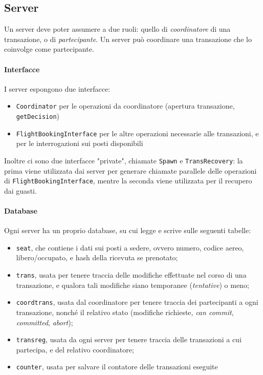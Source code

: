 \documentclass[a4paper]{article}
\begin{document}
\subsection{Server}
Un server deve poter assumere a due ruoli: quello di \textit{coordinatore} di una transazione, o di \textit{partecipante}. Un server può coordinare una transazione che lo coinvolge come partecipante.

\paragraph{Interfacce}I server espongono due interfacce:
\begin{itemize}
	\item \texttt{Coordinator} per le operazioni da coordinatore (apertura transazione, \texttt{getDecision})
	\item \texttt{FlightBookingInterface} per le altre operazioni necessarie alle transazioni, e per le interrogazioni sui posti disponibili
\end{itemize}
Inoltre ci sono due interfacce "private", chiamate \texttt{Spawn} e \texttt{TransRecovery}: la prima viene utilizzata dai server per generare chiamate parallele delle operazioni di \texttt{FlightBookingInterface}, mentre la seconda viene utilizzata per il recupero dai guasti.

\paragraph{Database}Ogni server ha un proprio database, su cui legge e scrive sulle seguenti tabelle:
\begin{itemize}
	\item \texttt{seat}, che contiene i dati sui posti a sedere, ovvero numero, codice aereo, libero/occupato, e hash della ricevuta se prenotato;
	\item \texttt{trans}, usata per tenere traccia delle modifiche effettuate nel corso di una transazione, e qualora tali modifiche siano temporanee (\textit{tentative}) o meno;
	\item \texttt{coordtrans}, usata dal coordinatore per tenere traccia dei partecipanti a ogni transazione, nonché il relativo stato (modifiche richieste, \textit{can commit}, \textit{committed}, \textit{abort});
	\item \texttt{transreg}, usata da ogni server per tenere traccia delle transazioni a cui partecipa, e del relativo coordinatore;
	\item \texttt{counter}, usata per salvare il contatore delle transazioni eseguite
\end{itemize}
\end{document}
